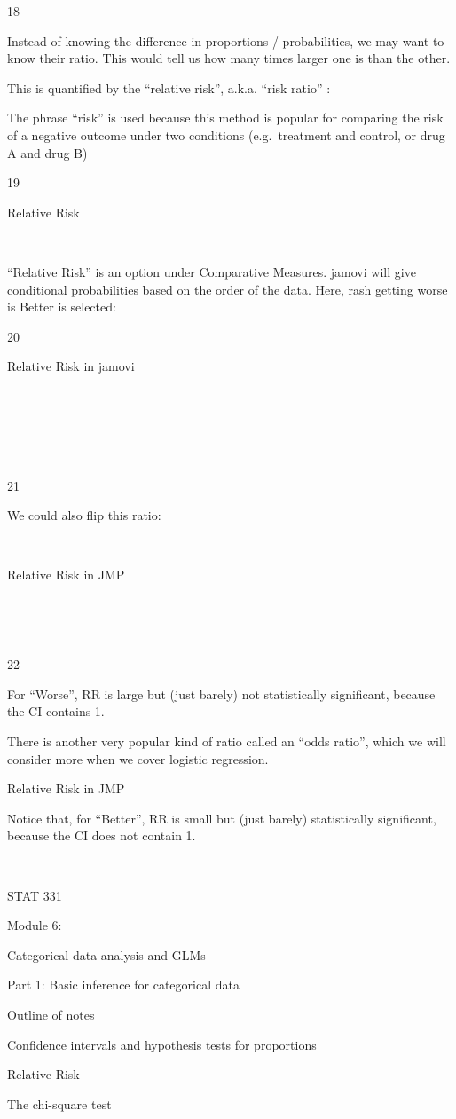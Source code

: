 \documentclass[
  letterpaper,
  DIV=11,
  numbers=noendperiod]{scrreprt}
\begin{document}
18

Instead of knowing the difference in proportions / probabilities, we may
want to know their ratio. This would tell us how many times larger one
is than the other.

This is quantified by the ``relative risk'', a.k.a. ``risk ratio'' :

The phrase ``risk'' is used because this method is popular for comparing
the risk of a negative outcome under two conditions (e.g.~treatment and
control, or drug A and drug B)

19

Relative Risk

~

``Relative Risk'' is an option under Comparative Measures. jamovi will
give conditional probabilities based on the order of the data. Here,
rash getting worse is Better is selected:

20

Relative Risk in jamovi

~

~

~

21

We could also flip this ratio:

~

Relative Risk in JMP

~

~

22

For ``Worse'', RR is large but (just barely) not statistically
significant, because the CI contains 1.

There is another very popular kind of ratio called an ``odds ratio'',
which we will consider more when we cover logistic regression.

Relative Risk in JMP

Notice that, for ``Better'', RR is small but (just barely) statistically
significant, because the CI does not contain 1. 

~

STAT 331

Module 6:

Categorical data analysis and GLMs

Part 1: Basic inference for categorical data

Outline of notes

Confidence intervals and hypothesis tests for proportions

Relative Risk

The chi-square test
\end{document}
